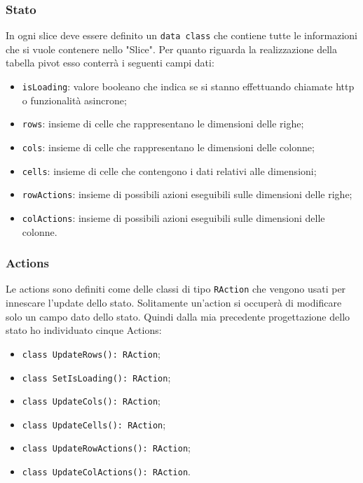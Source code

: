 \subsubsection*{Stato}
In ogni slice deve essere definito un \verb|data class| che contiene tutte le informazioni che si vuole contenere nello "Slice". Per quanto riguarda la realizzazione della tabella pivot esso conterrà i seguenti campi dati:
\begin{itemize}
	\item \verb|isLoading|: valore booleano che indica se si stanno effettuando chiamate http o funzionalità asincrone;
	\item \verb|rows|: insieme di celle che rappresentano le dimensioni delle righe;
	\item \verb|cols|: insieme di celle che rappresentano le dimensioni delle colonne;
	\item \verb|cells|: insieme di celle che contengono i dati relativi alle dimensioni;
	\item \verb|rowActions|: insieme di possibili azioni eseguibili sulle dimensioni delle righe;
	\item \verb|colActions|: insieme di possibili azioni eseguibili sulle dimensioni delle colonne.
\end{itemize}

\subsubsection*{Actions}
Le actions sono definiti come delle classi di tipo \verb|RAction| che vengono usati per innescare l'update dello stato. Solitamente un'action si occuperà di modificare solo un campo dato dello stato. Quindi dalla mia precedente progettazione dello stato ho individuato cinque Actions:
\begin{itemize}
	\item \verb|class UpdateRows(): RAction|;
	\item \verb|class SetIsLoading(): RAction|;
	\item \verb|class UpdateCols(): RAction|;
	\item \verb|class UpdateCells(): RAction|;
	\item \verb|class UpdateRowActions(): RAction|;
	\item \verb|class UpdateColActions(): RAction|.
\end{itemize}

